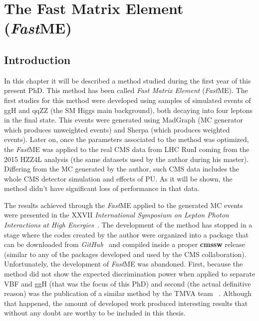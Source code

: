 \chapter{The Fast Matrix Element (\textit{Fast}ME)}

\section{Introduction}
In this chapter it will be described a method studied during the first year of this present PhD. This method has been called \textit{Fast Matrix Element} (\textit{Fast}ME). The first studies for this method were developed using samples of simulated events of ggH and qqZZ (the SM Higgs main background), both decaying into four leptons in the final state. This events were generated using MadGraph (MC generator which produces unweighted events) and Sherpa (which produces weighted events). Later on, once the parameters associated to the method was optimized, the \textit{Fast}ME was applied to the real CMS data from LHC RunI coming from the 2015 HZZ4L analysis (the same datasets used by the author during his master). Differing from the MC generated by the author, such CMS data includes the whole CMS detector simulation and effects of PU. As it will be shown, the method didn't have significant loss of performance in that data.

The results achieved through the \textit{Fast}ME applied to the generated MC events were presented in the XXVII \textit{International Symposium on Lepton Photon Interactions at High Energies}~\cite{bib:pos-sissa-245-2016-057}. The development of the method has stopped in a stage where the codes created by the author were organized into a package that can be downloaded from \textit{GitHub}~\cite{bib:fastme_package} and compiled inside a proper \textbf{cmssw} release (similar to any of the packages developed and used by the CMS collaboration). Unfortunately, the development of \textit{Fast}ME was abandoned. First, because the method did not show the expected discrimination power when applied to separate VBF and ggH (that was the focus of this PhD) and second (the actual definitive reason) was the publication of a similar method by the TMVA team ~\cite{bib:tmva_manual}. Although that happened, the amount of developed work produced interesting results that without any doubt are worthy to be included in this thesis.

